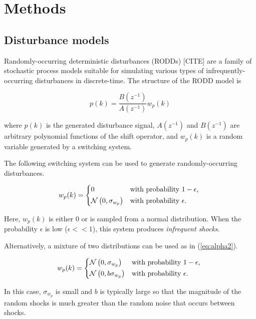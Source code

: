 \chapter{Methods}
\label{chap-methods}

\section{Disturbance models}

Randomly-occurring deterministic disturbances (RODDs) [CITE] are a family of stochastic process models suitable for simulating various types of infrequently-occurring disturbances in discrete-time.  The structure of the RODD model is

\begin{equation} \label{eq:RODD}
	p(k)= \frac{B(z^{-1})}{A(z^{-1})}w_p(k)
\end{equation}

where $p(k)$ is the generated disturbance signal, $A(z^{-1})$ and $B(z^{-1})$ are arbitrary polynomial functions of the shift operator, and $w_p(k)$ is a random variable generated by a switching system.

The following switching system can be used to generate randomly-occurring disturbances.

\begin{equation} \label{eq:alpha1}
w_p(k) = 
\begin{cases*}
	0 & with probability $1-\epsilon$, \\
	\mathcal{N}\left(0, \sigma_{w_p}\right) & with probability $\epsilon$.
\end{cases*}
\end{equation}

Here, $w_p(k)$ is either 0 or is sampled from a normal distribution.  When the probability $\epsilon$ is low ($\epsilon<<1$), this system produces \textit{infrequent shocks}.

Alternatively, a mixture of two distributions can be used as in (\ref{eq:alpha2}).

\begin{equation} \label{eq:alpha2}
w_p(k) = 
	\begin{cases*}
		\mathcal{N}\left(0, \sigma_{w_p}\right) & with probability $1-\epsilon$, \\
		\mathcal{N}\left(0, b\sigma_{w_p}\right) & with probability $\epsilon$.
	\end{cases*}
\end{equation}

In this case, $\sigma_{w_p}$ is small and $b$ is typically large so that the magnitude of the random shocks is much greater than the random noise that occurs between shocks.

